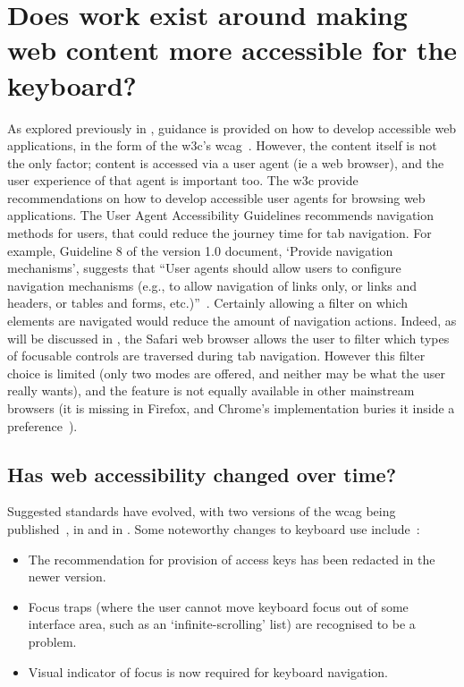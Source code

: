 \documentclass[11pt,openright,a4paper]{report}
\begin{document}
\section{Does work exist around making web content more accessible for the keyboard?}
\label{makingwebcontentkeyboardaccessible}
As explored previously in , guidance is provided on how to develop accessible web applications, in the form of the \gls{w3c}'s \gls{wcag}~\cite{chisholm2001web,wcag}. However, the content itself is not the only factor; content is accessed via a user agent (ie a web browser), and the user experience of that agent is important too. The \gls{w3c} provide recommendations on how to develop accessible user agents for browsing web applications\cite{jacobs2000user,allan2010user}. The User Agent Accessibility Guidelines recommends navigation methods for users, that could reduce the journey time for tab navigation. For example, Guideline 8 of the version 1.0 document, `Provide navigation mechanisms', suggests that ``User agents should allow users to configure navigation mechanisms (e.g., to allow navigation of links only, or links and headers, or tables and forms, etc.)''~\parencite[][p.17]{jacobs2000user}. Certainly allowing a filter on which elements are navigated would reduce the amount of navigation actions. Indeed, as will be discussed in , the Safari web browser allows the user to filter which types of focusable controls are traversed during tab navigation. However this filter choice is limited (only two modes are offered, and neither may be what the user really wants), and the feature is not equally available in other mainstream browsers (it is missing in Firefox, and Chrome's implementation buries it inside a preference~\cite{browserkeyboardaccess}).
\subsection{Has web accessibility changed over time?}
Suggested standards have evolved, with two versions of the \gls{wcag} being published~\cite{chisholm2001web,wcag}, in \citeyear{chisholm2001web} and in \citeyear{wcag}. Some noteworthy changes to keyboard use include~\cite{wcagcomparison}:
\begin{itemize}
\item The recommendation for provision of access keys has been redacted in the newer version.
\item Focus traps (where the user cannot move keyboard focus out of some interface area, such as an `infinite-scrolling' list) are recognised to be a problem.
\item Visual indicator of focus is now required for keyboard navigation.
\end{itemize}
\end{document}
